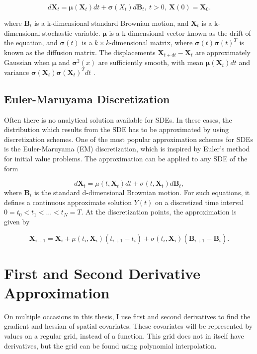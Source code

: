$$
    d{\textbf{X}}_t = {\pmb{\mu}} ({\textbf{X}}_t )dt + \pmb{\sigma}({X}_t ) d\textbf{B}_t, \   t > 0 , \ \textbf{X}(0) = \textbf{X}_0.
$$

where $\textbf{B}_t$ is a k-dimensional standard Brownian motion, and $\textbf{X}_t$ is a k-dimensional stochastic variable. $\pmb{\mu}$ is a k-dimensional vector known as the drift of the equation, and $\pmb{\sigma}(t)$ is a $k\times k$-dimensional matrix, where $\pmb{\sigma}(t)\pmb{\sigma}(t)^T$ is known as the diffusion matrix. The displacements $\textbf{X}_{t+dt} - \textbf{X}_t$ are approximately Gaussian when $\pmb{\mu}$ and $\pmb{\sigma}^2(x)$ are sufficiently smooth, with mean $\pmb{\mu}(\textbf{X}_t)dt$ and variance $\pmb{\sigma}(\textbf{X}_t)\pmb{\sigma}(\textbf{X}_t)^Tdt$ \parencite{bhattacharya_continuous_2023}.




\subsection{Euler-Maruyama  Discretization}
\label{subsec: Euler-Maruyama}
Often there is no analytical solution available for SDEs. In these cases, the distribution which results from the SDE has to be approximated by using discretization schemes.  One of the most popular approximation schemes for SDEs is the Euler-Maruyama (EM) discretization, which is inspired by Euler's method for initial value problems. The approximation can be applied to any SDE of the form

$$
d\textbf{X}_t = \mu(t, \textbf{X}_t)dt + \sigma(t, \textbf{X}_t)d\textbf{B}_t,
$$
where $\textbf{B}_t$ is the standard d-dimensional Brownian motion. For such equations, it defines a continuous approximate solution $Y(t)$ on a discretized time interval $0=t_0 < t_1 < \dots < t_N = T$. At the discretization points, the approximation is given by

\begin{equation}
    \textbf{X}_{i+1} = \textbf{X}_i + \mu(t_i, \textbf{X}_i)(t_{i+1} - t_i) + \sigma(t_i, \textbf{X}_i)(\textbf{B}_{i+1} - \textbf{B}_i).
    \label{eq: euler approximation}
\end{equation}

\parencite{iacus_simulation_2008}



\section{First and Second Derivative Approximation}
On multiple occasions in this thesis, I use first and second derivatives to find the gradient and hessian of spatial covariates. These covariates will be represented by values on a regular grid, instead of a function. This grid does not in itself have derivatives, but the grid can be found using polynomial interpolation.
